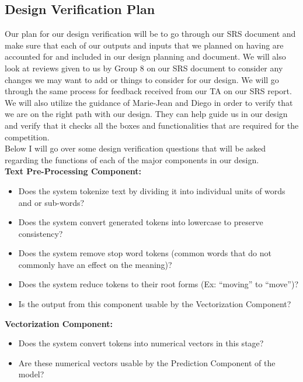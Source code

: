 \documentclass[12pt, titlepage]{article}
\begin{document}
  
  \subsection{Design Verification Plan} \label{Design Verification Plan}
  
  Our plan for our design verification will be to go through our SRS document and make sure that each of our outputs and inputs that we planned on having are accounted for and included in our design planning and document. We will also look at reviews given to us by Group 8 on our SRS document to consider any changes we may want to add or things to consider for our design. We will go through the same process for feedback received from our TA on our SRS report. We will also utilize the guidance of Marie-Jean and Diego in order to verify that we are on the right path with our design. They can help guide us in our design and verify that it checks all the boxes and functionalities that are required for the competition. \\

  Below I will go over some design verification questions that will be asked regarding the functions of each of the major components in our design.\\
  
  \noindent \textbf{Text Pre-Processing Component:}
  \begin{itemize}
  \item Does the system tokenize text by dividing it into individual units of words and or sub-words?
  \item Does the system convert generated tokens into lowercase to preserve consistency?
  \item Does the system remove stop word tokens (common words that do not commonly have an effect on the meaning)?
  \item Does the system reduce tokens to their root forms (Ex: “moving” to “move”)?
  \item Is the output from this component usable by the Vectorization Component?\\
  \end{itemize}
  
  
  
  \noindent \textbf{Vectorization Component:}
  \begin{itemize}
  \item Does the system convert tokens into numerical vectors in this stage?
  \item Are these numerical vectors usable by the Prediction Component of the model?\\
  \end{itemize}
  
\end{document}
